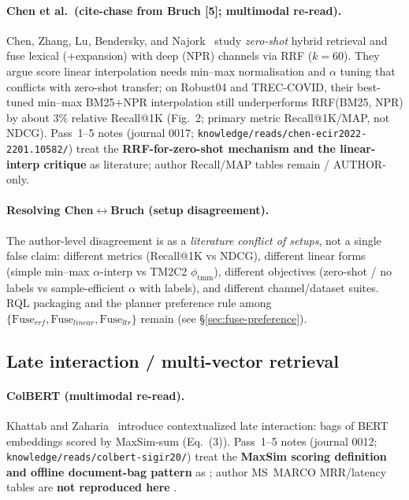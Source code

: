 \paragraph{Chen et al.\ (cite-chase from Bruch [5]; multimodal re-read).}
Chen, Zhang, Lu, Bendersky, and Najork~\citep{chen2022ood} study \emph{zero-shot} hybrid retrieval and fuse lexical (+expansion) with deep (NPR) channels via RRF (\(k{=}60\)).
They argue score linear interpolation needs min--max normalisation and \(\alpha\) tuning that conflicts with zero-shot transfer; on Robust04 and TREC-COVID, their best-tuned min--max BM25$+$NPR interpolation still underperforms RRF(BM25, NPR) by about 3\% relative Recall@1K (Fig.~2; primary metric Recall@1K/MAP, not NDCG).
Pass~1--5 notes (journal 0017; \texttt{knowledge/reads/chen-ecir2022-2201.10582/}) treat the \textbf{RRF-for-zero-shot mechanism and the linear-interp critique} as \established{} literature; author Recall/MAP tables remain \provisional{} / AUTHOR-only.

\paragraph{Resolving Chen$\leftrightarrow$Bruch (setup disagreement).}
The author-level disagreement is \established{} as a \emph{literature conflict of setups}, not a single false claim: different metrics (Recall@1K vs NDCG), different linear forms (simple min--max \(\alpha\)-interp vs TM2C2 \(\phi_{\mathrm{tmm}}\)), different objectives (zero-shot / no labels vs sample-efficient \(\alpha\) with labels), and different channel/dataset suites.
RQL packaging and the planner preference rule among \(\{\mathrm{Fuse}_{rrf},\mathrm{Fuse}_{linear},\mathrm{Fuse}_{ltr}\}\) remain \hypothesis{} (see \S\ref{sec:fuse-preference}).

\subsection{Late interaction / multi-vector retrieval}
\paragraph{ColBERT (multimodal re-read).}
Khattab and Zaharia~\citep{khattab2020colbert} introduce contextualized late interaction: bags of BERT embeddings scored by MaxSim-sum (Eq.~(3)).
Pass~1--5 notes (journal 0012; \texttt{knowledge/reads/colbert-sigir20/}) treat the \textbf{MaxSim scoring definition and offline document-bag pattern} as \established{}; author MS~MARCO MRR/latency tables are \textbf{not reproduced here} \provisional{}.

